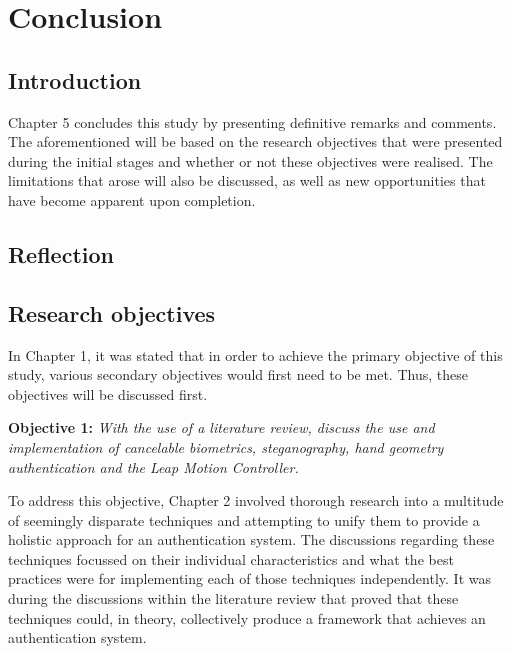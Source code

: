 \chapter{Conclusion}


\section{Introduction}

Chapter 5 concludes this study by presenting definitive remarks and comments. The aforementioned will be based on the research objectives that were presented during the initial stages and whether or not these objectives were realised. The limitations that arose will also be discussed, as well as new opportunities that have become apparent upon completion.

\section{Reflection}


\section{Research objectives}

In Chapter 1, it was stated that in order to achieve the primary objective of this study, various secondary objectives would first need to be met. Thus, these objectives will be discussed first.


\textbf{Objective 1:} \textit{With the use of a literature review, discuss the use and implementation of cancelable biometrics, steganography, hand geometry authentication and the Leap Motion Controller.}


To address this objective, Chapter 2 involved thorough research into a multitude of seemingly disparate techniques and attempting to unify them to provide a holistic approach for an authentication system. The discussions regarding these techniques focussed on their individual characteristics and what the best practices were for implementing each of those techniques independently. It was during the discussions within the literature review that proved that these techniques could, in theory, collectively produce a framework that achieves an authentication system.\\


